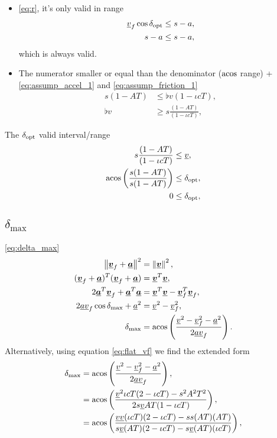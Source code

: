 \begin{itemize}
\item
\eqref{eq:r}, it's only valid in range
\begin{align*}
\flat{v}_f \cos\delta_{\opt} &\le s - a,\\
s - a&\le s - a,
\end{align*}
which is always valid.

\item
The numerator smaller or equal than the denominator ($\operatorname{acos}$ range) + \eqref{eq:assump_accel_1} and \eqref{eq:assump_friction_1}
\begin{align*}
s (1 - AT) &\le \flat{v}(1 - \iota cT),\\
\flat{v} &\ge s \frac{(1 - AT)}{(1 - \iota cT)},
\end{align*}
\end{itemize}

The $\delta_{\operatorname{opt}}$ valid interval/range
\begin{align*}
s \frac{(1 - AT)}{(1 - \iota cT)} &\le \flat{v},\\
\acos\left( \frac{s(1 - AT)}{s(1 - AT)} \right) &\le \delta_{\opt},\\
0 &\le \delta_{\opt},
\end{align*}


\subsection{$\delta_{\max}$}
\eqref{eq:delta_max}
\begin{align*}
\norm{\vec{\flat{v}}_f + \vec{\flat{a}}}^2 &= \norm{\vec{\flat{v}}}^2,\\
(\vec{\flat{v}}_f + \vec{\flat{a}})^T (\vec{\flat{v}}_f + \vec{\flat{a}}) &= \vec{\flat{v}}^T \vec{\flat{v}},\\
2 \vec{\flat{a}}^T \vec{\flat{v}}_f + \vec{\flat{a}}^T \vec{\flat{a}} &= \vec{\flat{v}}^T \vec{\flat{v}} - \vec{\flat{v}}_f^T \vec{\flat{v}}_f,\\
2 \flat{a} \flat{v}_f \cos\delta_{\max} + \flat{a}^2 &= \flat{v}^2 - \flat{v}_f^2,\\
\delta_{\max} &= \acos\left( \frac{\flat{v}^2 - \flat{v}_f^2 - \flat{a}^2}{2 \flat{a} \flat{v}_f} \right).
\end{align*}
Alternatively, using equation \eqref{eq:flat_vf} we find the extended form
\begin{align*}
\delta_{\max} &= \acos\left( \frac{\flat{v}^2 - \flat{v}_f^2 - \flat{a}^2}{2 \flat{a} \flat{v}_f} \right),\\
&= \acos\left( \frac{\flat{v}^2 \iota cT(2 - \iota cT) - s^2 A^2 T^2}{2 s \flat{v} AT(1 - \iota cT)} \right),\\
&= \acos\left( \frac{\flat{v} \flat{v} (\iota cT)(2 - \iota cT) - ss (AT)(AT)}{s \flat{v} (AT)(2 - \iota cT) - s \flat{v} (AT)(\iota cT)} \right),
\end{align*}


